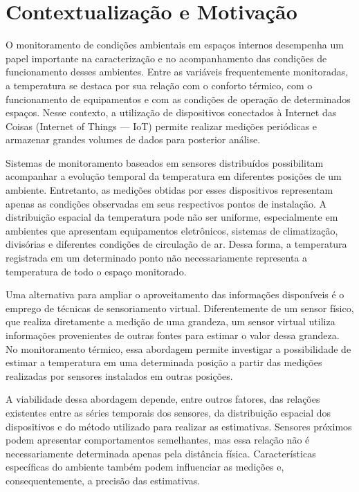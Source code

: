 \label{sec:introducao}

\section{Contextualização e Motivação}
O monitoramento de condições ambientais em espaços internos desempenha um papel importante na caracterização e no acompanhamento das condições de funcionamento desses ambientes. Entre as variáveis frequentemente monitoradas, a temperatura se destaca por sua relação com o conforto térmico, com o funcionamento de equipamentos e com as condições de operação de determinados espaços. Nesse contexto, a utilização de dispositivos conectados à Internet das Coisas (Internet of Things — IoT) permite realizar medições periódicas e armazenar grandes volumes de dados para posterior análise.

Sistemas de monitoramento baseados em sensores distribuídos possibilitam acompanhar a evolução temporal da temperatura em diferentes posições de um ambiente. Entretanto, as medições obtidas por esses dispositivos representam apenas as condições observadas em seus respectivos pontos de instalação. A distribuição espacial da temperatura pode não ser uniforme, especialmente em ambientes que apresentam equipamentos eletrônicos, sistemas de climatização, divisórias e diferentes condições de circulação de ar. Dessa forma, a temperatura registrada em um determinado ponto não necessariamente representa a temperatura de todo o espaço monitorado.

Uma alternativa para ampliar o aproveitamento das informações disponíveis é o emprego de técnicas de sensoriamento virtual. Diferentemente de um sensor físico, que realiza diretamente a medição de uma grandeza, um sensor virtual utiliza informações provenientes de outras fontes para estimar o valor dessa grandeza. No monitoramento térmico, essa abordagem permite investigar a possibilidade de estimar a temperatura em uma determinada posição a partir das medições realizadas por sensores instalados em outras posições.

A viabilidade dessa abordagem depende, entre outros fatores, das relações existentes entre as séries temporais dos sensores, da distribuição espacial dos dispositivos e do método utilizado para realizar as estimativas. Sensores próximos podem apresentar comportamentos semelhantes, mas essa relação não é necessariamente determinada apenas pela distância física. Características específicas do ambiente também podem influenciar as medições e, consequentemente, a precisão das estimativas.

